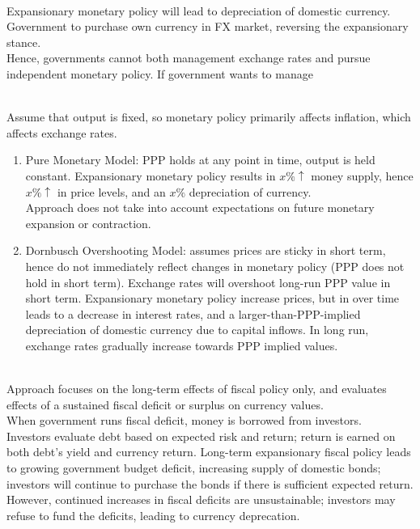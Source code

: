 \begin{remark} \\
Expansionary monetary policy will lead to depreciation of domestic currency. Government to purchase own currency in FX market, reversing the expansionary stance.\\
Hence, governments cannot both management exchange rates and pursue independent monetary policy. If government wants to manage 
\end{remark}

\begin{definition} \\
Assume that output is fixed, so monetary policy primarily affects inflation, which affects exchange rates.
\begin{enumerate}[label=\roman*.]
\setlength{\itemsep}{0pt}
\item Pure Monetary Model: PPP holds at any point in time, output is held constant. Expansionary monetary policy results in $x \% \uparrow$ money supply, hence  $x \% \uparrow$ in price levels, and an  $x \%$ depreciation of currency.\\
Approach does not take into account expectations on future monetary expansion or contraction.
\item Dornbusch Overshooting Model: assumes prices are sticky in short term, hence do not immediately reflect changes in monetary policy (PPP does not hold in short term). Exchange rates will overshoot long-run PPP value in short term. Expansionary monetary policy increase prices, but in over time leads to a decrease in interest rates, and a larger-than-PPP-implied depreciation of domestic currency due to capital inflows. In long run, exchange rates gradually increase towards PPP implied values.
\end{enumerate}
\end{definition}

\begin{definition} \\
Approach focuses on the long-term effects of fiscal policy only, and evaluates effects of a sustained fiscal deficit or surplus on currency values.\\
When government runs fiscal deficit, money is borrowed from investors.\\
Investors evaluate debt based on expected risk and return; return is earned on both debt's yield and currency return. Long-term expansionary fiscal policy leads to growing government budget deficit, increasing supply of domestic bonds; investors will continue to purchase the bonds if there is sufficient expected return.\\
However, continued increases in fiscal deficits are unsustainable; investors may refuse to fund the deficits, leading to currency deprecation.
\end{definition}

